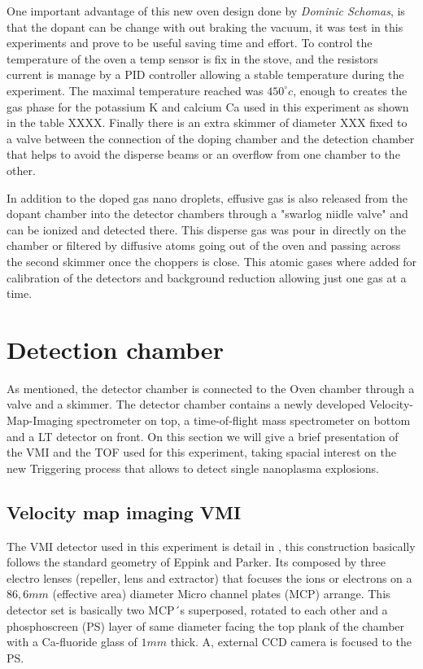 One important advantage of this new oven design done by \textit{Dominic Schomas},  is that the dopant can be change with out braking the vacuum, it was test in this experiments and prove to be useful saving time and effort. To control the temperature of the oven a temp sensor is fix in the stove, and the resistors current is manage by a PID controller allowing a stable temperature during the experiment. The maximal temperature reached was $450^{\circ}c$,  enough to creates the gas phase for the potassium K and calcium Ca used in this experiment as shown in the table XXXX. Finally there is an  extra skimmer of diameter XXX fixed to a valve between the connection of the doping chamber and the detection chamber that helps to avoid the disperse beams or an overflow from one chamber to the other.

In addition to the doped gas nano droplets, effusive gas is also released from the dopant chamber into the detector chambers through a "swarlog niidle valve" and can be ionized and detected there. This disperse gas was pour in directly on the chamber or filtered by diffusive atoms going out of the oven and passing across the second skimmer once the choppers is close. This atomic gases where added for calibration of the detectors and background reduction allowing just one gas at a time.

\section{Detection chamber}

As mentioned, the detector chamber is connected to the Oven chamber through a valve and a skimmer. The detector chamber contains a newly developed Velocity-Map-Imaging
spectrometer on top, a time-of-flight mass spectrometer on bottom and a LT detector on front. On this section we will give a brief presentation of  the VMI and the TOF used for this experiment, taking spacial interest on the new Triggering process that allows to detect single nanoplasma explosions. 

\subsection{Velocity map imaging VMI}

The VMI detector used in this experiment is detail in \cite{schomas_compact_2017}, this construction basically follows the standard geometry of Eppink and Parker\cite{eppink_velocity_1997}. Its composed by three electro lenses (repeller, lens and extractor) that focuses the ions or electrons on a $86,6mm$ (effective area) diameter Micro channel plates (MCP) arrange. This detector set is basically  two MCP´s superposed,  rotated to each other and a phosphoscreen (PS) layer of same diameter facing the top plank of the chamber with a Ca-fluoride glass of $1mm$ thick. A, external CCD camera is focused to the PS. 

